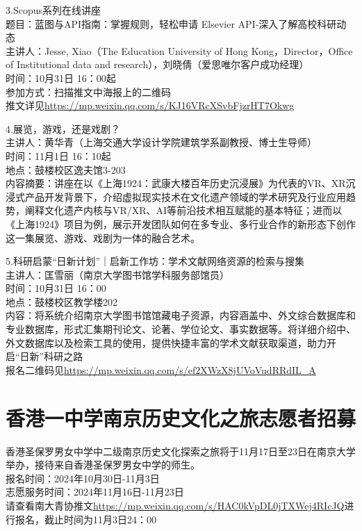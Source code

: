 \documentclass[letterpaper, 12pt]{article}
\begin{document}
\begin{multicols}{2}
3.Scopus系列在线讲座\\
题目：蓝图与API指南：掌握规则，轻松申请  Elsevier API-深入了解高校科研动态\\
主讲人：Jesse, Xiao（The Education University of Hong Kong，Director，Office of Institutional data and research），刘晓倩（爱思唯尔客户成功经理）\\
时间：10月31日 16：00起\\
参加方式：扫描推文中海报上的二维码\\
推文详见\url{https://mp.weixin.qq.com/s/KJ16VRcXSvbFjzrHT7Okwg}

4.展览，游戏，还是戏剧？\\
主讲人：黄华青（上海交通大学设计学院建筑学系副教授、博士生导师）\\
时间：11月1日 16：10起\\
地点：鼓楼校区逸夫馆3-203\\
内容摘要：讲座在以《上海1924：武康大楼百年历史沉浸展》为代表的VR、XR沉浸式产品开发背景下，介绍虚拟现实技术在文化遗产领域的学术研究及行业应用趋势，阐释文化遗产内核与VR/XR、AI等前沿技术相互赋能的基本特征；进而以《上海1924》项目为例，展示开发团队如何在多专业、多行业合作的新形态下创作这一集展览、游戏、戏剧为一体的融合艺术。

5.科研启蒙“日新计划”｜启新工作坊：学术文献网络资源的检索与搜集\\
主讲人：匡雪丽（南京大学图书馆学科服务部馆员）\\
时间：10月31日 16：00\\
地点：鼓楼校区教学楼202\\
内容：将系统介绍南京大学图书馆馆藏电子资源，内容涵盖中、外文综合数据库和专业数据库，形式汇集期刊论文、论著、学位论文、事实数据等。将详细介绍中、外文数据库以及检索工具的使用，提供快捷丰富的学术文献获取渠道，助力开启“日新”科研之路\\
报名二维码见\url{https://mp.weixin.qq.com/s/ef2XWzX8jUVoVudRRdIL_A}

\section{香港一中学南京历史文化之旅志愿者招募}
香港圣保罗男女中学中二级南京历史文化探索之旅将于11月17日至23日在南京大学举办，接待来自香港圣保罗男女中学的师生。\\
报名时间：2024年10月30日-11月3日\\
志愿服务时间：2024年11月16日-11月23日\\
请查看南大青协推文\url{https://mp.weixin.qq.com/s/HAC0kVpDL0jTXWej4RIcJQ}进行报名，截止时间为11月3日24：00\\


\end{multicols}
\end{document}
